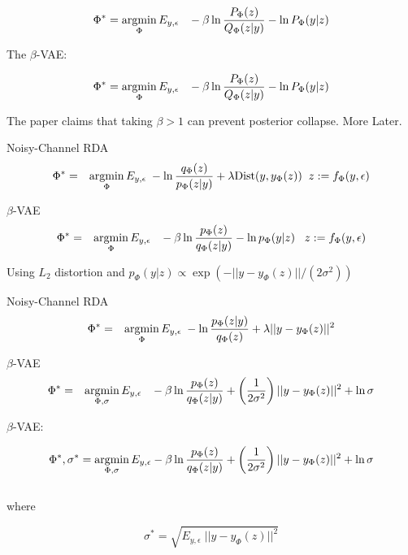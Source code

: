 {$$\Phi^* = \operatorname*{argmin}_\Phi E_{y,\epsilon}\;\;\;-\beta\ln \frac{P_\Phi(z)}{Q_\Phi(z|y)} - \ln P_\Phi(y|z)$$


The $\beta$-VAE:

$$\Phi^* = \operatorname*{argmin}_\Phi E_{y,\epsilon}\;\;\;-\beta \ln \frac{P_\Phi(z)}{Q_\Phi(z|y)} - \ln P_\Phi(y|z)$$

\vfill
The paper claims that taking $\beta > 1$ can prevent posterior collapse. More Later.



Noisy-Channel RDA
\begin{eqnarray*}
\Phi^* & = & \operatorname*{argmin}_\Phi E_{y,\epsilon}\;-\ln \frac{q_\Phi(z)}{p_\Phi(z|y)} + \lambda \mathrm{Dist}(y,y_\Phi(z))\;\;z := f_\Phi(y,\epsilon)
\end{eqnarray*}


\vfill
$\beta$-VAE
\begin{eqnarray*}
\Phi^* & = & \operatorname*{argmin}_\Phi E_{y,\epsilon}\;\;\;-\beta \ln \frac{p_\Phi(z)}{q_\Phi(z|y)} - \ln p_\Phi(y|z)\;\;\;z := f_\Phi(y,\epsilon)
\end{eqnarray*}



Using $L_2$ distortion and $p_\Phi(y|z) \propto \exp(-||y - y_\Phi(z)||/(2\sigma^2))$

\vfill
Noisy-Channel RDA
\begin{eqnarray*}
\Phi^* & = & \operatorname*{argmin}_\Phi E_{y,\epsilon}\;-\ln \frac{p_\Phi(z|y)}{q_\Phi(z)} + \lambda ||y - y_\Phi(z)||^2
\end{eqnarray*}

\vfill
$\beta$-VAE
\begin{eqnarray*}
\Phi^* & = & \operatorname*{argmin}_{\Phi,\sigma} E_{y,\epsilon}\;\;\;-\beta\ln \frac{p_\Phi(z)}{q_\Phi(z|y)} +\left(\frac{1}{2\sigma^2}\right)||y - y_\Phi(z)||^2 + \ln \sigma
\end{eqnarray*}


$\beta$-VAE:

$$\Phi^*,\sigma^*  =  \operatorname*{argmin}_{\Phi,\sigma} E_{y,\epsilon} - \beta \ln \frac{p_\Phi(z)}{q_\Phi(z|y)} +\left(\frac{1}{2\sigma^2}\right)||y - y_\Phi(z)||^2 + \ln \sigma$$
\\
\vfill
where

$$\sigma^*  =  \sqrt{E_{y,\epsilon}\; ||y - y_\Phi(z)||^2}$$



}
